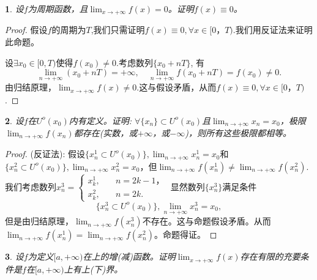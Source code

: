 \documentclass[utf8]{book}
\newtheorem{example}{}[section]             %
\begin{document}
\begin{example}
设$f$为周期函数，且$\displaystyle\lim_{x\to +\infty}f(x)=0$。证明$f(x)\equiv 0$。
\end{example}
\begin{proof}
假设$f$的周期为$T$,我们只需证明$f(x)\equiv 0,\forall x\in [0，T)$.我们用反证法来证明此命题。

设$\exists x_0\in[0,T)$使得$f(x_0)\neq 0$.考虑数列$\{x_0+nT\}$, 有
$$\displaystyle\lim_{n\to +\infty}(x_0+nT)=+\infty, \quad \displaystyle\lim_{n\to +\infty}f(x_0+nT)=f(x_0)\neq 0.$$
由归结原理，$\displaystyle\lim_{x\to +\infty}f(x)\neq 0$.这与假设矛盾，从而$f(x)\equiv 0,\forall x\in [0，T)$.
\end{proof}
\begin{example}
设$f$在$U^o(x_0)$内有定义。证明: $\forall \{x_n\}\subset U^o(x_0)$且$\displaystyle\lim_{n\to +\infty}x_n=x_0$，极限$\displaystyle\lim_{n\to +\infty}f(x_n)$都存在(实数，或$+\infty$，或$-\infty$)，则所有这些极限都相等。
\end{example}
\begin{proof}(反证法):
假设$\{x^1_n\subset U^o(x_0)\}, \displaystyle\lim_{n\to +\infty}x^1_n=x_0$和$\{x^2_n\subset U^o(x_0)\}, \displaystyle\lim_{n\to +\infty}x^2_n=x_0$，但$\displaystyle\lim_{n\to +\infty}f(x^1_n)\neq \displaystyle\lim_{n\to +\infty}f(x^2_n)$. 我们考虑数列$x^3_n=
\begin{cases}
x^1_k,\quad&n=2k-1，\\
x^2_k,\quad&n=2k.
\end{cases}$
显然数列$\{x^3_n\}$满足条件
$$\{x^3_n\subset U^o(x_0)\}, \displaystyle\lim_{n\to +\infty}x^3_n=x_0,$$
但是由归结原理，$\displaystyle\lim_{n\to +\infty}f(x^3_n)$不存在。这与命题假设矛盾。从而
$\displaystyle\lim_{n\to +\infty}f(x^1_n) = \displaystyle\lim_{n\to +\infty}f(x^2_n)$。命题得证。
\end{proof}
\begin{example}
设$f$为定义$[a,+\infty)$在上的增(减)函数。证明$\displaystyle\lim_{x\to +\infty}f(x)$存在有限的充要条件是$f$在$[a,+\infty)$上有上(下)界。
\end{example}
\end{document}
